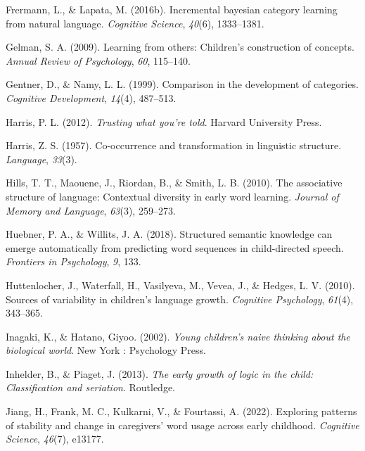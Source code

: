 \documentclass[english,,man]{apa6}
\begin{document}
\leavevmode\hypertarget{ref-frermann2016incremental}{}%
Frermann, L., \& Lapata, M. (2016b). Incremental bayesian category learning from natural language. \emph{Cognitive Science}, \emph{40}(6), 1333--1381.

\leavevmode\hypertarget{ref-gelman2009}{}%
Gelman, S. A. (2009). Learning from others: Children's construction of concepts. \emph{Annual Review of Psychology}, \emph{60}, 115--140.

\leavevmode\hypertarget{ref-gentner1999comparison}{}%
Gentner, D., \& Namy, L. L. (1999). Comparison in the development of categories. \emph{Cognitive Development}, \emph{14}(4), 487--513.

\leavevmode\hypertarget{ref-harris2012}{}%
Harris, P. L. (2012). \emph{Trusting what you're told}. Harvard University Press.

\leavevmode\hypertarget{ref-harris1957}{}%
Harris, Z. S. (1957). Co-occurrence and transformation in linguistic structure. \emph{Language}, \emph{33}(3).

\leavevmode\hypertarget{ref-hills2010}{}%
Hills, T. T., Maouene, J., Riordan, B., \& Smith, L. B. (2010). The associative structure of language: Contextual diversity in early word learning. \emph{Journal of Memory and Language}, \emph{63}(3), 259--273.

\leavevmode\hypertarget{ref-huebner2018}{}%
Huebner, P. A., \& Willits, J. A. (2018). Structured semantic knowledge can emerge automatically from predicting word sequences in child-directed speech. \emph{Frontiers in Psychology}, \emph{9}, 133.

\leavevmode\hypertarget{ref-huttenlocher2010sources}{}%
Huttenlocher, J., Waterfall, H., Vasilyeva, M., Vevea, J., \& Hedges, L. V. (2010). Sources of variability in children's language growth. \emph{Cognitive Psychology}, \emph{61}(4), 343--365.

\leavevmode\hypertarget{ref-inagaki2002}{}%
Inagaki, K., \& Hatano, Giyoo. (2002). \emph{Young children's naive thinking about the biological world}. New York : Psychology Press.

\leavevmode\hypertarget{ref-inhelder2013}{}%
Inhelder, B., \& Piaget, J. (2013). \emph{The early growth of logic in the child: Classification and seriation}. Routledge.

\leavevmode\hypertarget{ref-jiang2022exploring}{}%
Jiang, H., Frank, M. C., Kulkarni, V., \& Fourtassi, A. (2022). Exploring patterns of stability and change in caregivers' word usage across early childhood. \emph{Cognitive Science}, \emph{46}(7), e13177.
\end{document}
